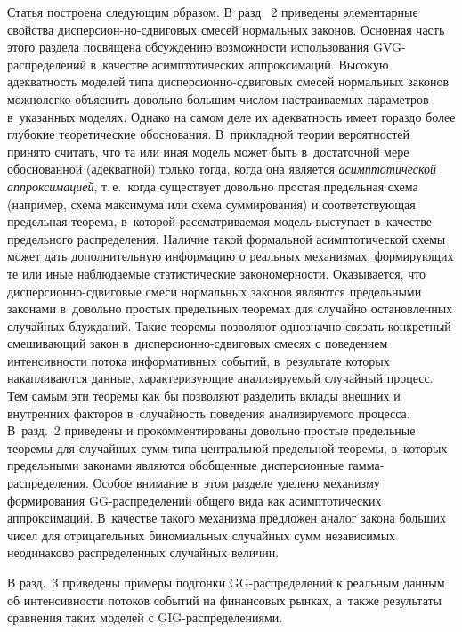 \begin{multicols}{2}
Статья построена следующим образом. В~разд.~2 приведены
элементарные свойства дисперси\-он-\linebreak но-сдвиговых смесей нормальных
законов. Основная часть этого раздела посвящена обсуждению\linebreak
возможности использования GVG-рас\-пре\-де\-ле\-ний в~качестве
асимптотических аппроксимаций. Высокую адекватность моделей типа
дис\-пер\-си\-он\-но-сдви\-го\-вых смесей нормальных законов можно\linebreak легко
объяснить довольно большим числом настраиваемых параметров 
в~указанных моделях. Однако на самом деле их адекватность имеет
гораздо более глубокие теоретические обоснования. В~прикладной
теории вероятностей принято считать, что та или иная модель может
быть в~достаточной мере обоснованной (адекватной) только тогда,
когда она является {\it асимптотической аппроксимацией}, т.\,е.\
когда существует довольно простая предельная схема (например, схема
максимума или схема суммирования) и соответствующая предельная
теорема, в~которой рассматриваемая модель выступает в~качестве
предельного распределения. Наличие такой формальной асимптотической
схемы может дать дополнительную информацию о реальных механизмах,
формирующих те или иные наблюдаемые статистические закономерности.
Оказывается, что дис\-пер\-си\-он\-но-сдви\-го\-вые смеси нормальных законов
являются предельными законами в~довольно простых предельных теоремах
для случайно остановленных случайных блужданий. Такие теоремы
позволяют однозначно связать конкретный смешивающий закон 
в~дис\-пер\-си\-он\-но-сдви\-го\-вых смесях с поведением интенсивности потока
информативных событий, в~результате которых накапливаются данные,
характеризующие анализируемый случайный процесс. Тем самым эти
теоремы как бы позволяют разделить вклады внешних и внутренних
факторов в~случайность поведения анализируемого процесса. 
В~разд.~2 приведены и прокомментированы довольно простые предельные тео\-ре\-мы
для случайных сумм типа центральной предельной тео\-ре\-мы, в~которых
предельными законами являются обобщенные дисперсионные
гам\-ма-рас\-пре\-де\-ле\-ния. Особое внимание в~этом разделе уделено
механизму формирования GG-рас\-пре\-де\-ле\-ний общего вида как
асимптотических аппроксимаций. В~качестве такого механизма предложен
аналог закона больших чисел для отрицательных биномиальных случайных
сумм независимых неодинаково распределенных случайных величин.

В разд.~3 приведены примеры подгонки GG-рас\-пре\-де\-ле\-ний к реальным
данным об интенсивности потоков событий на финансовых рынках, 
а~также результаты сравнения таких моделей с GIG-рас\-пре\-де\-ле\-ниями.


\end{multicols}
